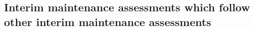 \documentclass[a4paper,12pt]{article}
\begin{document}
%
%
%
%
%
%
%
%
%

\subsection[9. Interim maintenance assessments which follow other interim maintenance assessments]{Interim maintenance assessments which follow other interim maintenance assessments}
\end{document}
